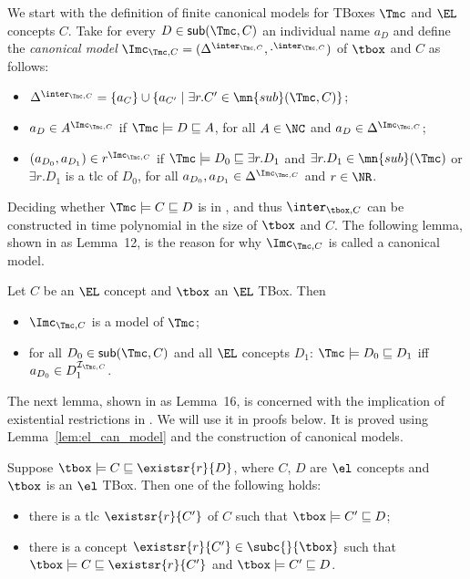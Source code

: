 \documentclass{lmcs}
\theoremstyle{definition}
\begin{document}
We start with the definition of finite canonical models for \EL TBoxes
$\Tmc$ and $\EL$ concepts $C$.  Take for every
$D\in {\sf sub}(\Tmc,C)$ an individual name $a_{D}$ and define the
\emph{canonical model}
$\Imc_{\Tmc,C} =(\Delta^{\inter_{\Tmc,C}},\cdot^{\inter_{\Tmc,C}})$ of
$\tbox$ and $C$ as follows:
\begin{itemize}
\item $\Delta^{\inter_{\Tmc,C}}= \{a_{C}\} \cup \{ a_{C'} \mid \exists
  r.C'\in \mn{sub}(\Tmc,C)\}$;
\item $a_{D} \in A^{\Imc_{\Tmc,C}}$ if $\Tmc \models D \sqsubseteq A$, for all $A \in \NC$ and $a_{D} \in
  \Delta^{\Imc_{\Tmc,C}}$;
\item $(a_{D_{0}},a_{D_{1}})\in r^{{\Imc}_{\Tmc,C}}$ if $\Tmc \models
  D_{0} \sqsubseteq \exists r.D_{1}$ and $\exists r.D_{1} \in
  \mn{sub}(\Tmc)$ or $\exists r . D_{1}$ is a tlc of $D_{0}$, for all
  $a_{D_{0}},a_{D_{1}}\in \Delta^{\Imc_{\Tmc,C}}$ and $r\in \NR$.
\end{itemize}
%
Deciding whether $\Tmc\models C \sqsubseteq D$ is in \ptime
\cite{BaBrLu-IJCAI-05}, and thus $\inter_{\tbox,C}$
can be constructed in time polynomial in the size of $\tbox$ and $C$. 
The following lemma, shown in \cite{jlc} as Lemma~12, is the reason
for why $\Imc_{\Tmc,C}$ is called a canonical
model.
%
\begin{lem}\label{lem:el_can_model}
  Let $C$ be an $\EL$ concept and $\tbox$ an $\EL$ TBox. Then
  \begin{itemize}
  \item $\Imc_{\Tmc,C}$ is a model of $\Tmc$;
  \item for all $D_{0}\in {\sf sub}(\Tmc,C)$ and
    all $\EL$ concepts $D_{1}$: $\Tmc \models D_{0} \sqsubseteq D_{1}$
    iff $a_{D_{0}} \in D_{1}^{\mathcal{I}_{\Tmc,C}}$.
  \end{itemize}
\end{lem}
%
The next lemma, shown in \cite{jlc} as Lemma~16, is concerned
with the implication of existential restrictions in \EL. We will use
it in proofs below. It is proved using Lemma~\ref{lem:el_can_model}
and the construction of canonical models.
%
\begin{lem}\label{lem:existential_conseq}
  Suppose $\tbox\models C\sqsubseteq\existsr{r}{D}$, where $C$, $D$
  are $\el$ concepts and $\tbox$ is an $\el$ TBox. Then one of the
  following holds:
  \begin{itemize}
  \item there is a tlc $\existsr{r}{C'}$ of $C$ such that
    $\tbox\models C'\sqsubseteq D$;
  \item there is a concept $\existsr{r}{C'}\in\subc{}{\tbox}$ such that
    $\tbox\models C\sqsubseteq \existsr{r}{C'}$ and $\tbox\models
    C'\sqsubseteq D$.
  \end{itemize}
\end{lem}
\end{document}
